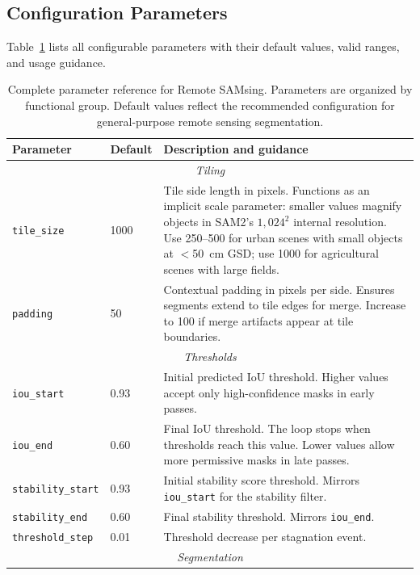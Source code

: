 \documentclass[review,11pt,authoryear]{elsarticle}
\begin{document}
\subsection{Configuration Parameters}
\label{sec:params}

Table~\ref{tab:params} lists all configurable parameters with their default values, valid ranges, and usage guidance.

\begin{table}[htbp]
\centering
\caption{Complete parameter reference for Remote SAMsing. Parameters are organized by functional group. Default values reflect the recommended configuration for general-purpose remote sensing segmentation.}
\label{tab:params}
\scriptsize
\begin{tabular}{p{3.8cm}lp{6cm}}
\toprule
Parameter & Default & Description and guidance \\
\midrule
\multicolumn{3}{c}{\textit{Tiling}} \\
\midrule
\texttt{tile\_size} & 1000 & Tile side length in pixels. Functions as an implicit scale parameter: smaller values magnify objects in SAM2's $1{,}024^2$ internal resolution. Use 250--500 for urban scenes with small objects at $<$50~cm GSD; use 1000 for agricultural scenes with large fields. \\
\texttt{padding} & 50 & Contextual padding in pixels per side. Ensures segments extend to tile edges for merge. Increase to 100 if merge artifacts appear at tile boundaries. \\
\midrule
\multicolumn{3}{c}{\textit{Thresholds}} \\
\midrule
\texttt{iou\_start} & 0.93 & Initial predicted IoU threshold. Higher values accept only high-confidence masks in early passes. \\
\texttt{iou\_end} & 0.60 & Final IoU threshold. The loop stops when thresholds reach this value. Lower values allow more permissive masks in late passes. \\
\texttt{stability\_start} & 0.93 & Initial stability score threshold. Mirrors \texttt{iou\_start} for the stability filter. \\
\texttt{stability\_end} & 0.60 & Final stability threshold. Mirrors \texttt{iou\_end}. \\
\texttt{threshold\_step} & 0.01 & Threshold decrease per stagnation event. \\
\midrule
\multicolumn{3}{c}{\textit{Segmentation}} \\

\end{tabular}
\end{table}
\end{document}
